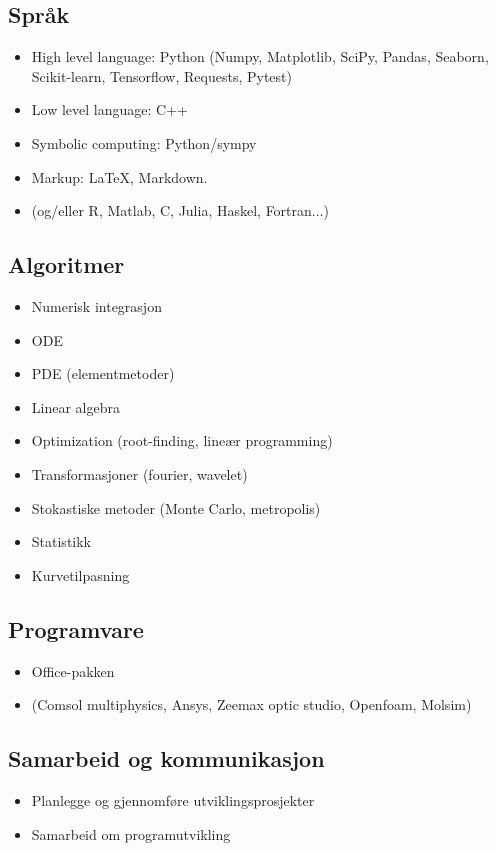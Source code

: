 \subsection{Språk}
\begin{itemize}
	\item High level language: Python (Numpy, Matplotlib, SciPy, Pandas, Seaborn, Scikit-learn, Tensorflow, Requests, Pytest)
	\item Low level language: C++
	\item Symbolic computing: Python/sympy
	\item Markup: LaTeX, Markdown.
	\item (og/eller R, Matlab, C, Julia, Haskel, Fortran...)
\end{itemize}

\subsection{Algoritmer}
\begin{itemize}
	\item Numerisk integrasjon
	\item ODE
	\item PDE (elementmetoder)
	\item Linear algebra
	\item Optimization (root-finding, lineær programming)
	\item Transformasjoner (fourier, wavelet)
	\item Stokastiske metoder (Monte Carlo, metropolis)
	\item Statistikk
	\item Kurvetilpasning
\end{itemize}


\subsection{Programvare}
\begin{itemize}
	\item Office-pakken
	\item (Comsol multiphysics, Ansys, Zeemax optic studio, Openfoam, Molsim)
\end{itemize}


\subsection{Samarbeid og kommunikasjon}
\begin{itemize}
	\item Planlegge og gjennomføre utviklingsprosjekter
	\item Samarbeid om programutvikling
\end{itemize}

